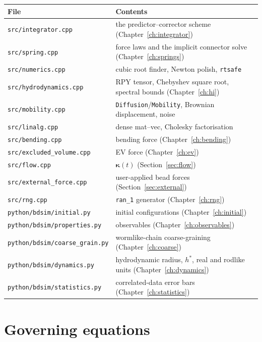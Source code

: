 \documentclass[11pt,a4paper]{report}
\newcommand{\code}[1]{\texttt{\seqsplitcode{#1}}}
\newcommand{\seqsplitcode}[1]{#1}
\begin{document}
\begin{longtable}{@{}p{}p{}@{}}
\toprule
File & Contents \\
\midrule
\endhead
\code{src/integrator.cpp} & the predictor--corrector scheme (Chapter~\ref{ch:integrator}) \\
\code{src/spring.cpp}     & force laws and the implicit connector solve (Chapter~\ref{ch:springs}) \\
\code{src/numerics.cpp}   & cubic root finder, Newton polish, \code{rtsafe} \\
\code{src/hydrodynamics.cpp} & RPY tensor, Chebyshev square root, spectral bounds (Chapter~\ref{ch:hi}) \\
\code{src/mobility.cpp}   & \code{Diffusion}/\code{Mobility}, Brownian displacement, noise \\
\code{src/linalg.cpp}     & dense mat--vec, Cholesky factorisation \\
\code{src/bending.cpp}    & bending force (Chapter~\ref{ch:bending}) \\
\code{src/excluded\_volume.cpp} & EV force (Chapter~\ref{ch:ev}) \\
\code{src/flow.cpp}       & $\bm{\kappa}(t)$ (Section~\ref{sec:flow}) \\
\code{src/external\_force.cpp} & user-applied bead forces (Section~\ref{sec:external}) \\
\code{src/rng.cpp}        & \code{ran\_1} generator (Chapter~\ref{ch:rng}) \\
\code{python/bdsim/initial.py} & initial configurations (Chapter~\ref{ch:initial}) \\
\code{python/bdsim/properties.py} & observables (Chapter~\ref{ch:observables}) \\
\code{python/bdsim/coarse\_grain.py} & wormlike-chain coarse-graining (Chapter~\ref{ch:coarse}) \\
\code{python/bdsim/dynamics.py} & hydrodynamic radius, $h^{*}$, real and rodlike units (Chapter~\ref{ch:dynamics}) \\
\code{python/bdsim/statistics.py} & correlated-data error bars (Chapter~\ref{ch:statistics}) \\
\bottomrule
\end{longtable}

\chapter{Governing equations}
\label{ch:governing}
\end{document}
